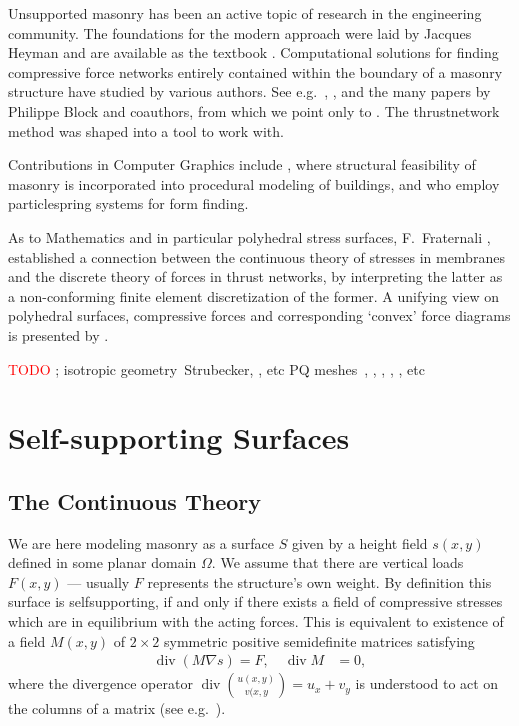 \documentclass[annual]{acmsiggraph}
\def\Div{\mathop{\textrm{div}}\nolimits}
\newcommand{\todo}[1]{\textcolor{red}{#1}}
\begin{document}
Unsupported masonry has been an active topic of research in the 
engineering community. The foundations for the modern approach were laid 
by Jacques Heyman  and are available as the textbook 
\cite{Heyman95}. Computational solutions for finding compressive force 
networks entirely contained within the boundary of a masonry structure 
have studied by various authors. See e.g.\ \cite{Livesley92}, 
\cite{O'Dwyer98}, and the many papers by Philippe Block and coauthors, 
from which we point only to \cite{Block07}. The thrust\dash network method 
was shaped into a tool to work with.

Contributions in Computer Graphics include \cite{Whiting09}, where 
structural feasibility of masonry is incorporated into procedural modeling 
of buildings, and \cite{Kilian2005} who employ particle\dash spring 
systems for form finding.

As to Mathematics and in particular polyhedral stress surfaces, 
F.~Fraternali ,  
established a connection between the continuous theory of stresses in 
membranes and the discrete theory of forces in thrust networks, by 
interpreting the latter as a non-conforming finite element discretization 
of the former. A unifying view on polyhedral surfaces, compressive forces 
and corresponding `convex' force diagrams is presented by \cite{Ash1988}.

\todo{TODO} \cite{Giaquinta1985}; isotropic geometry~Strubecker, 
\cite{Koenderink2002}, etc PQ meshes~\cite{Schiftner2010}, 
\cite{Glymph2004}, \cite{Pottmann2007b}, \cite{Mirko2010}, 
\cite{wardetzky07}, etc



\section{Self-supporting Surfaces}

\subsection{The Continuous Theory}

We are here modeling masonry as a surface $S$ given by a height field 
$s(x,y)$ defined in some planar domain $\Omega$. We assume that there are 
vertical loads $F(x,y)$ --- usually $F$ represents the structure's own 
weight. By definition this surface is self\dash supporting, if and only if 
there exists a field of compressive stresses which are in equilibrium with 
the acting forces. This is equivalent to existence of a field $M(x,y)$ of 
$2\times 2$ symmetric positive semidefinite matrices satisfying
	\begin{align}
	\Div (M\nabla s) = F, \quad
	\Div M &= 0,
	  \label{eq:conds}
	\end{align} 
 where the divergence operator $\Div{u(x,y)\choose v(x,y}= u_x + v_y$ is 
understood to act on the columns of a matrix (see e.g.\ 
\cite{Fraternali2010}).
\end{document}
